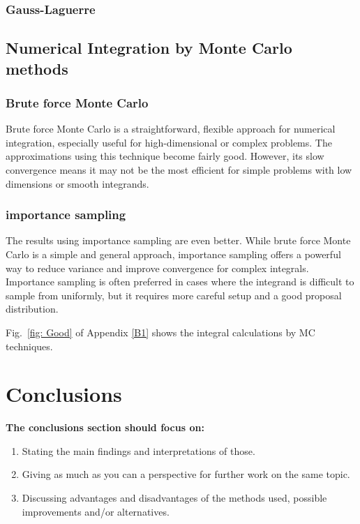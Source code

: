 \documentclass[aip,reprint]{revtex4-1}
\begin{document}
\subsubsection{Gauss-Laguerre}

 

\subsection{Numerical Integration by Monte Carlo methods}\label{subsec:temp}

\subsubsection{Brute force Monte Carlo}


Brute force Monte Carlo is a straightforward, flexible approach for numerical integration, especially useful for high-dimensional or complex problems. The approximations using this technique become fairly good. However, its slow convergence means it may not be the most efficient for simple problems with low dimensions or smooth integrands.

\subsubsection{importance sampling}

The results using importance sampling are even better. 
While brute force Monte Carlo is a simple and general approach, importance sampling offers a powerful way to reduce variance and improve convergence for complex integrals. Importance sampling is often preferred in cases where the integrand is difficult to sample from uniformly, but it requires more careful setup and a good proposal distribution.


Fig.~\ref{fig: Good} of Appendix \ref{B1} shows the integral calculations by MC techniques.

\section{Conclusions}\label{sec:conclusions}

\textbf{The conclusions section should focus on:}
\begin{enumerate}
    \item Stating the main findings and interpretations of those.
    \item Giving as much as you can a perspective for further work on the same topic. 
    \item Discussing advantages and disadvantages of the methods used, possible improvements and/or alternatives.
\end{enumerate}
\end{document}
